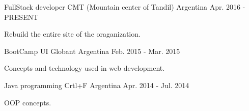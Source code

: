 


\begin{cventries}

\cventry
{FullStack developer} %
{CMT (Mountain center of Tandil)} %
{Argentina} %
{Apr. 2016 - PRESENT} %
{ %
\begin{cvitems}
\item {Rebuild the entire site of the oraganization.}
\end{cvitems}
}




\cventry
{BootCamp UI} %
{Globant} %
{Argentina} %
{Feb. 2015 - Mar. 2015} %
{ %
\begin{cvitems}
\item {Concepts and technology used in web development.}
\end{cvitems}
}


\cventry
{Java programming} %
{Crtl+F} %
{Argentina} %
{Apr. 2014 - Jul. 2014} %
{ %
\begin{cvitems}
\item {OOP concepts.}
\end{cvitems}
}


\end{cventries}
